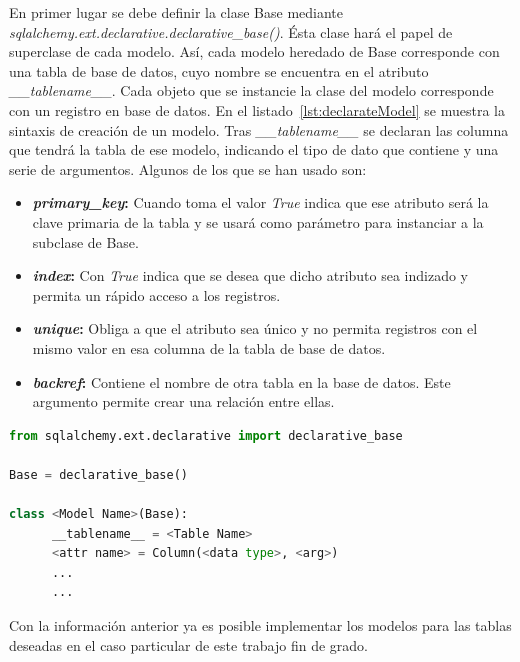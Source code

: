 En primer lugar se debe definir la clase Base mediante \textit{sqlalchemy.ext.declarative.declarative\_base()}. Ésta clase hará el papel de superclase de cada modelo. Así, cada modelo heredado de Base corresponde con una tabla de base de datos, cuyo nombre se encuentra en el atributo \textit{\_\_tablename\_\_}. Cada objeto que se instancie la clase del modelo corresponde con un registro en base de datos. En el listado~\ref{lst:declarateModel} se muestra la sintaxis de creación de un modelo. Tras \textit{\_\_tablename\_\_} se declaran las columna que tendrá la tabla de ese modelo, indicando el tipo de dato que contiene y una serie de argumentos. Algunos de los que se han usado son:
\begin{itemize}
       \item \textbf{\textit{primary\_key}:} Cuando toma el valor \textit{True} indica que ese atributo será la clave primaria de la tabla y se usará como parámetro para instanciar a la subclase de Base.
       \item \textbf{\textit{index}:} Con \textit{True} indica que se desea que dicho atributo sea indizado y permita un rápido acceso a los registros.
       \item \textbf{\textit{unique}:} Obliga a que el atributo sea único y no permita registros con el mismo valor en esa columna de la tabla de base de datos.
       \item \textbf{\textit{backref}:} Contiene el nombre de otra tabla en la base de datos. Este argumento permite crear una relación entre ellas.
\end{itemize}
\begin{lstlisting}[language=Python,float=ht,caption={Declaración de un modelo heredado de \textit{Base}},label={lst:declarateModel}]
from sqlalchemy.ext.declarative import declarative_base

Base = declarative_base()

class <Model Name>(Base):
      __tablename__ = <Table Name>
      <attr name> = Column(<data type>, <arg>)
      ...
      ...
\end{lstlisting}
Con la información anterior ya es posible implementar los modelos para las tablas deseadas en el caso particular de este trabajo fin de grado.
